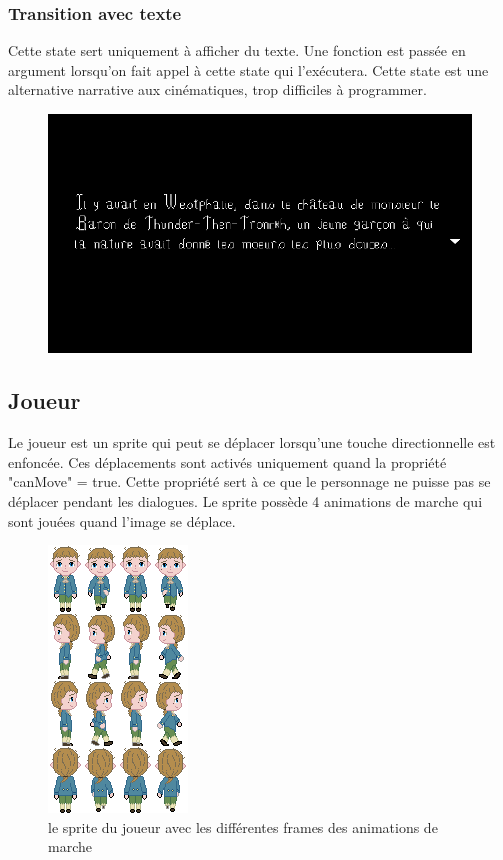 \documentclass[11pt]{article}
\begin{document}
\subsubsection{Transition avec texte}
Cette state sert uniquement à afficher du texte. Une fonction est passée en argument lorsqu'on fait appel à cette state qui l'exécutera. Cette state est une alternative narrative aux cinématiques, trop difficiles à programmer.
\begin{figure}[H]
\includegraphics[scale=0.33]{introScreen}
\centering
\end{figure}  
\subsection{Joueur}
Le joueur est un sprite qui peut se déplacer lorsqu'une touche directionnelle est enfoncée. Ces déplacements sont activés uniquement quand la propriété "canMove" = true. Cette propriété sert à ce que le personnage ne puisse pas se déplacer pendant les dialogues. Le sprite possède 4 animations de marche qui sont jouées quand l'image se déplace.\\
\begin{figure}[h]
\includegraphics[scale=0.5]{candideSprite}
\centering
\caption{le sprite du joueur avec les différentes frames des animations de marche}
\end{figure}
\end{document}
